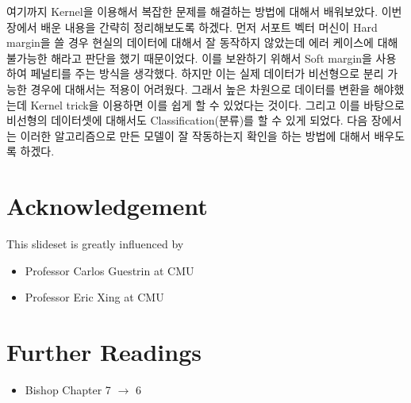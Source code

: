 \documentclass[a4paper]{oblivoir}
\begin{document}
\indent 여기까지 Kernel을 이용해서 복잡한 문제를 해결하는 방법에 대해서 배워보았다. 이번 장에서 배운 내용을 간략히 정리해보도록 하겠다. 먼저 서포트 벡터 머신이 Hard margin을 쓸 경우 현실의 데이터에 대해서 잘 동작하지 않았는데 에러 케이스에 대해 불가능한 해라고 판단을 했기 때문이었다. 이를 보완하기 위해서 Soft margin을 사용하여 페널티를 주는 방식을 생각했다. 하지만 이는 실제 데이터가 비선형으로 분리 가능한 경우에 대해서는 적용이 어려웠다. 그래서 높은 차원으로 데이터를 변환을 해야했는데 Kernel trick을 이용하면 이를 쉽게 할 수 있었다는 것이다. 그리고 이를 바탕으로 비선형의 데이터셋에 대해서도 Classification(분류)를 할 수 있게 되었다. 다음 장에서는 이러한 알고리즘으로 만든 모델이 잘 작동하는지 확인을 하는 방법에 대해서 배우도록 하겠다.

\section*{Acknowledgement}
\noindent This slideset is greatly influenced by
\begin{itemize}\setlength\itemsep{-\parsep}
\item Professor Carlos Guestrin at CMU
\item Professor Eric Xing at CMU
\end{itemize}

\section*{Further Readings}
\begin{itemize}
\setlength\itemsep{-\parsep}
\item Bishop Chapter 7 $\rightarrow$ 6
\end{itemize}
\end{document}
